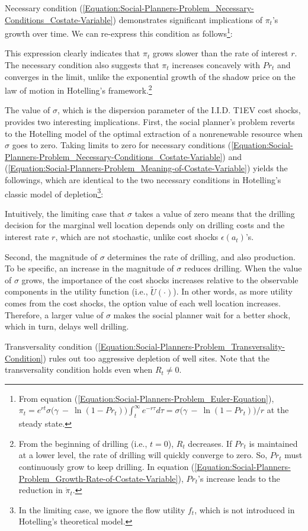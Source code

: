 Necessary condition (\ref{Equation:Social-Planners-Problem_Necessary-Conditions_Costate-Variable}) demonstrates significant implications of $\pi_{t}$'s growth over time. We can re-express this condition as follows\footnote{From equation (\ref{Equation:Social-Planners-Problem_Euler-Equation}), $\pi_{t} = e^{rt} \sigma \big( \gamma \ - \ \ln(1 - Pr_{t}) \big) \int_{t}^{\infty} e^{-r\tau} d\tau = \sigma \big( \gamma \ - \ \ln(1 - Pr_{t}) \big) / r$ at the steady state.}:

This expression clearly indicates that $\pi_{t}$ grows slower than the rate of interest $r$. The necessary condition also suggests that $\pi_{t}$ increases concavely with $Pr_{t}$ and converges in the limit, unlike the exponential growth of the shadow price on the law of motion in Hotelling's framework.\footnote{From the beginning of drilling (i.e., $t = 0$), $R_{t}$ decreases. If $Pr_{t}$ is maintained at a lower level, the rate of drilling will quickly converge to zero. So, $Pr_{t}$ must continuously grow to keep drilling. In equation (\ref{Equation:Social-Planners-Problem_Growth-Rate-of-Costate-Variable}), $Pr_{t}$'s increase leads to the reduction in $\dot{\pi}_{t}$.} 

The value of $\sigma$, which is the dispersion parameter of the I.I.D. T1EV cost shocks, provides two interesting implications. First, the social planner's problem reverts to the Hotelling model of the optimal extraction of a nonrenewable resource when $\sigma$ goes to zero. Taking limits to zero for necessary conditions (\ref{Equation:Social-Planners-Problem_Necessary-Conditions_Costate-Variable}) and (\ref{Equation:Social-Planners-Problem_Meaning-of-Costate-Variable}) yields the followings, which are identical to the two necessary conditions in Hotelling's classic model of depletion\footnote{In the limiting case, we ignore the flow utility $f_{t}$, which is not introduced in Hotelling's theoretical model.}:

Intuitively, the limiting case that $\sigma$ takes a value of zero means that the drilling decision for the marginal well location depends only on drilling costs and the interest rate $r$, which are not stochastic, unlike cost shocks $\epsilon(a_{t})$'s.

Second, the magnitude of $\sigma$ determines the rate of drilling, and also production. To be specific, an increase in the magnitude of $\sigma$ reduces drilling. When the value of $\sigma$ grows, the importance of the cost shocks increases relative to the observable components in the utility function (i.e., $\tilde{U}(\cdot)$). In other words, as more utility comes from the cost shocks, the option value of each well location increases. Therefore, a larger value of $\sigma$ makes the social planner wait for a better shock, which in turn, delays well drilling. 

Transversality condition (\ref{Equation:Social-Planners-Problem_Transversality-Condition}) rules out too aggressive depletion of well sites. Note that the transversality condition holds even when $R_{t} \neq 0$.
